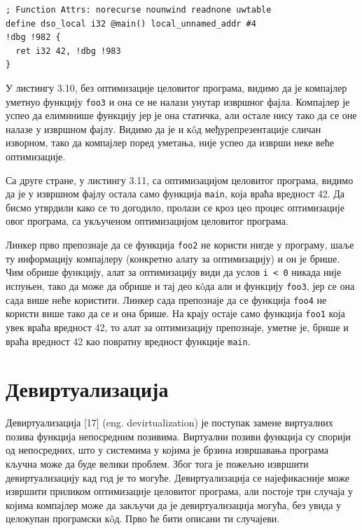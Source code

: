 \documentclass[12pt,oneside]{memoir}
\begin{document}
\begin{lstlisting}[frame=single,caption={Међурепрезентација са оптимизацијом целовитог програма }, captionpos=b]
; Function Attrs: norecurse nounwind readnone uwtable
define dso_local i32 @main() local_unnamed_addr #4 
!dbg !982 {
  ret i32 42, !dbg !983
}
\end{lstlisting}

У листингу 3.10, без оптимизације целовитог програма, видимо да је компајлер уметнуо
функцију \texttt{foo3} и она се не налази унутар извршног фајла.
Компајлер је успео да елиминише функцију јер је она статичка, али остале нису
тако да се оне налазе у извршном фајлу.
Видимо да је и к\^{o}д међурепрезентације сличан изворном, тако да компајлер поред
уметања, није успео да изврши неке веће оптимизације.

Са друге стране, у листингу 3.11, са оптимизацијом целовитог програма, видимо да је у
извршном фајлу остала само функција \texttt{main}, која враћа вредност 42.
Да бисмо утврдили како се то догодило, пролази се кроз цео процес оптимизације овог 
програма, са укљученом оптимизацијом целовитог програма.
\par
Линкер прво препознаје да се функција \texttt{foo2} не користи нигде у програму, шаље ту
информацију компајлеру (конкретно алату за оптимизацију) и он је брише.
Чим обрише функцију, алат за оптимизацију види да услов \texttt{i < 0} никада није испуњен,
тако да може да обрише и тај део к\^{o}да али и функцију \texttt{foo3}, јер се она сада
више неће користити.
Линкер сада препознаје да се функција \texttt{foo4} не користи више тако да се и она брише.
На крају остаје само функција \texttt{foo1} која увек враћа вредност 42, то алат за оптимизацију
препознаје, уметне је, брише и враћа вредност 42 као повратну вредност функције
\texttt{main}.

\section{Девиртуализација}
 Девиртуализација [17] (eng. devirtualization) је поступак замене виртуалних позива
 функција непосредним позивима.
 Виртуални позиви функција су спорији од непосредних, што у системима
 у којима је брзина извршавања програма кључна може да буде велики проблем.
 Због тога је пожељно извршити девиртуализацију кад год је то могуће.
 Девиртуализација се најефикасније може извршити приликом оптимизације целовитог
 програма, али постоје три случаја у којима компајлер може да закључи да је 
 девиртуализација могућа, без увида у целокупан програмски к\^{o}д.
 Прво ће бити описани ти случајеви.
 
\end{document}
